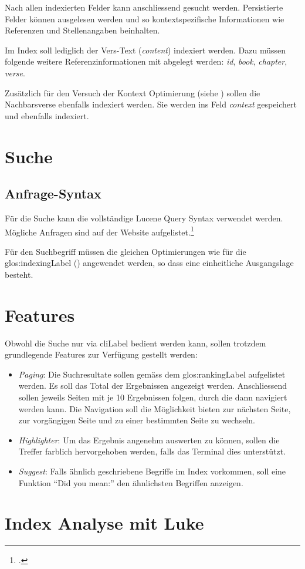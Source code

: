 Nach allen indexierten Felder kann anschliessend gesucht werden. Persistierte Felder können ausgelesen werden und so kontextspezifische Informationen wie Referenzen und Stellenangaben beinhalten.

Im Index soll lediglich der Vers-Text (\textit{content}) indexiert werden.
Dazu müssen folgende weitere Referenzinformationen mit abgelegt werden: \textit{id}, \textit{book}, \textit{chapter}, \textit{verse}.

Zusätzlich für den Versuch der Kontext Optimierung (siehe ) sollen die Nachbarsverse ebenfalls indexiert werden. Sie werden ins Feld \textit{context} gespeichert und ebenfalls indexiert.


\section{Suche}
\subsection{Anfrage-Syntax}
Für die Suche kann die vollständige Lucene Query Syntax verwendet werden. Mögliche Anfragen sind auf der Website aufgelistet.\footcite{Lucene_Query_Syntax_Lucene_Tutorial_2016-05-09}

Für den Suchbegriff müssen die gleichen Optimierungen wie für die \gls{glos:indexingLabel} () angewendet werden, so dass eine einheitliche Ausgangslage besteht.

\section{Features}
Obwohl die Suche nur via \gls{cliLabel} bedient werden kann, sollen trotzdem grundlegende Features zur Verfügung gestellt werden:
\begin{itemize}
	\item \textit{Paging}:
	Die Suchresultate sollen gemäss dem \gls{glos:rankingLabel} aufgelistet werden. Es soll das Total der Ergebnissen angezeigt werden. Anschliessend sollen jeweils Seiten mit je 10 Ergebnissen folgen, durch die dann navigiert werden kann.
	Die Navigation soll die Möglichkeit bieten zur nächsten Seite, zur vorgängigen Seite und zu einer bestimmten Seite zu wechseln.
	
	\item \textit{Highlighter}:
	Um das Ergebnis angenehm auswerten zu können, sollen die Treffer farblich hervorgehoben werden, falls das Terminal dies unterstützt.

	\item \textit{Suggest}:
	Falls ähnlich geschriebene Begriffe im Index vorkommen, soll eine Funktion "`Did you mean:"' den ähnlichsten Begriffen anzeigen.
	
	
\end{itemize}

\section{Index Analyse mit Luke}
